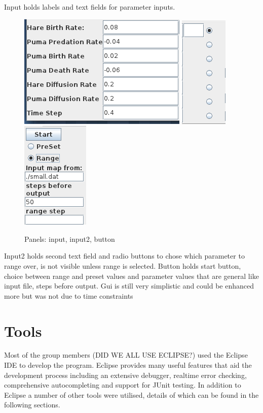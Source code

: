 \documentclass[11pt]{report}
\begin{document}
Input holds labels and text fields for parameter inputs. 
\begin{figure} [input]
\begin{center}
\includegraphics[scale = 0.5]{figs/input.png}
\includegraphics[scale = 0.5]{figs/input2.png}
\includegraphics[scale = 0.5]{figs/button.png}
\caption{Panels: input, input2, button}
\label{fig:input}
\end{center}
\end{figure}
Input2 holds second text field and radio buttons to chose which parameter to range over, is not visible unless range is selected. 
Button holds start button, choice between range and preset values and parameter values that are general like input file, steps before output.
Gui is still very simplistic and could be enhanced more but was not due to time constraints
   
   \section{Tools}
Most of the group members (DID WE ALL USE ECLIPSE?) used the Eclipse IDE to develop the program. Eclipse provides many useful features that aid the development process including an extensive debugger, realtime error checking, comprehensive autocompleting and support for JUnit testing. In addition to Eclipse a number of other tools were utilised, details of which can be found in the following sections.
\end{document}
